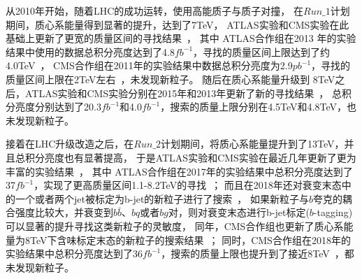 从2010年开始，随着LHC的成功运转，使用高能质子与质子对撞，
在$Run\_1$计划期间，质心系能量得到显著的提升，达到了7TeV，
ATLAS实验和CMS实验在此基础上更新了更宽的质量区间的寻找结果~\cite{ATLASDijet1,ATLASDijet2,ATLASDijet3,ATLASDijet4,CMSDijet1,CMSDijet2}，
其中 ATLAS合作组在2013 年的实验结果中使用的数据总积分亮度达到了4.8$fb^{-1}$，寻找的质量区间上限达到了约4.0TeV~\cite{ATLASDijet4}，
CMS合作组在2011年的实验结果中数据总积分亮度为2.9$pb^{-1}$，寻找的质量区间上限在2TeV左右~\cite{CMSDijet2}，未发现新粒子。
随后在质心系能量升级到 8TeV之后，ATLAS实验和CMS实验分别在2015年和2013年更新了新的寻找结果~\cite{ATLASDijet5,CMSDijet3}，
总积分亮度分别达到了20.3$fb^{-1}$和4.0$fb^{-1}$，搜索的质量上限分别在4.5TeV和4.8TeV，也未发现新粒子。

接着在LHC升级改造之后，在$Run\_2$计划期间，将质心系能量提升到了13TeV，并且总积分亮度也有显著提高，
于是ATLAS实验和CMS实验在最近几年更新了更为丰富的实验结果~\cite{ATLASDijet6,ATLASDijet7,ATLASDijet8,ATLASDijet9,CMSDijet4,CMSDijet5,CMSDijet6}，
其中 ATLAS合作组在2017年的实验结果中总积分亮度达到了37$fb^{-1}$，实现了更高质量区间1.1-8.2TeV的寻找~\cite{ATLASDijet8}；
而且在2018年还对衰变末态中的一个或者两个jet被标定为b-jet的新粒子进行了搜索~\cite{ATLASDijet9}，
如果新粒子与$b$夸克的耦合强度比较大，并衰变到$b\bar{b}$、$bq$或者$bg$对，则对衰变末态进行b-jet标定($b$-tagging)可以显著的提升寻找这类新粒子的灵敏度，
同年，CMS合作组也更新了质心系能量为8TeV下含味标定末态的新粒子的搜索结果~\cite{CMSDijet7}；
同时，CMS合作组在2018年的实验结果中总积分亮度达到了36$fb^{-1}$，搜索的质量上限也提升到了接近8TeV~\cite{CMSDijet6}，都未发现新粒子。

